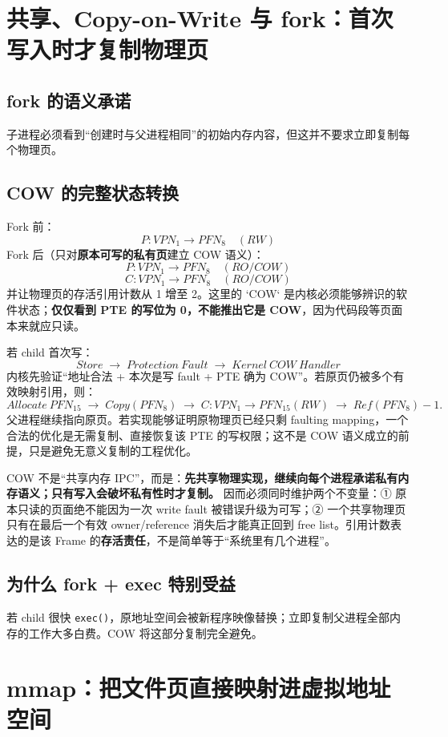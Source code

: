 \documentclass[11pt,a4paper]{ctexart}
\newcommand{\kw}[1]{\textbf{#1}}
\newcommand{\code}[1]{\texttt{#1}}
\newcommand{\arr}{\;\longrightarrow\;}
\begin{document}
\section{共享、Copy-on-Write 与 fork：首次写入时才复制物理页}

\subsection{fork 的语义承诺}
子进程必须看到“创建时与父进程相同”的初始内存内容，但这并不要求立即复制每个物理页。

\subsection{COW 的完整状态转换}
Fork 前：
\[
P:VPN_1\to PFN_8\quad (RW)
\]
Fork 后（只对\kw{原本可写的私有页}建立 COW 语义）：
\[
P:VPN_1\to PFN_8\quad (RO/COW)
\]
\[
C:VPN_1\to PFN_8\quad (RO/COW)
\]
并让物理页的存活引用计数从 1 增至 2。这里的 `COW` 是内核必须能够辨识的软件状态；\kw{仅仅看到 PTE 的写位为 0，不能推出它是 COW}，因为代码段等页面本来就应只读。

若 child 首次写：
\[
Store\arr Protection\ Fault\arr Kernel\ COW\ Handler
\]
内核先验证“地址合法 + 本次是写 fault + PTE 确为 COW”。若原页仍被多个有效映射引用，则：
\[
Allocate\ PFN_{15}\arr Copy(PFN_8)\arr C:VPN_1\to PFN_{15}(RW)\arr Ref(PFN_8)-1.
\]
父进程继续指向原页。若实现能够证明原物理页已经只剩 faulting mapping，一个合法的优化是无需复制、直接恢复该 PTE 的写权限；这不是 COW 语义成立的前提，只是避免无意义复制的工程优化。

\begin{corebox}
COW 不是“共享内存 IPC”，而是：\kw{先共享物理实现，继续向每个进程承诺私有内存语义；只有写入会破坏私有性时才复制。} 因而必须同时维护两个不变量：① 原本只读的页面绝不能因为一次 write fault 被错误升级为可写；② 一个共享物理页只有在最后一个有效 owner/reference 消失后才能真正回到 free list。引用计数表达的是该 Frame 的\kw{存活责任}，不是简单等于“系统里有几个进程”。
\end{corebox}

\subsection{为什么 fork + exec 特别受益}
若 child 很快 \code{exec()}，原地址空间会被新程序映像替换；立即复制父进程全部内存的工作大多白费。COW 将这部分复制完全避免。

\section{mmap：把文件页直接映射进虚拟地址空间}
\end{document}
